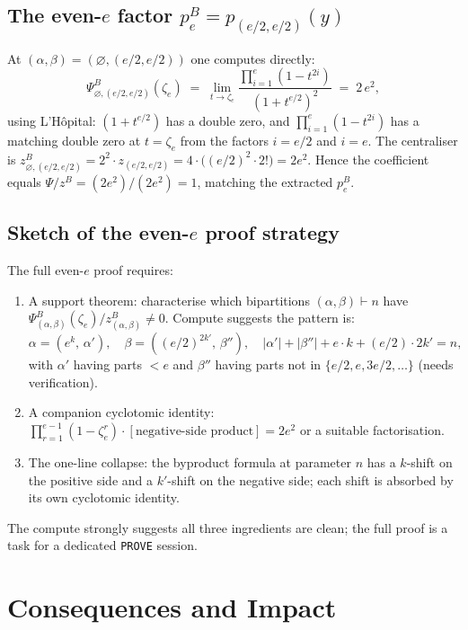 \documentclass[11pt]{article}
\theoremstyle{remark}
\newcommand{\peB}{p_e^B}
\newcommand{\zetae}{\zeta_e}
\newcommand{\emptyy}{\varnothing}
\begin{document}
\subsection*{The even-$e$ factor $\peB = p_{(e/2, e/2)}(y)$}

At $(\alpha, \beta) = (\emptyy, (e/2, e/2))$ one computes directly:
\[
  \Psi^B_{\emptyy, (e/2, e/2)}(\zetae)
  \;=\; \lim_{t \to \zetae} \frac{\prod_{i=1}^{e}(1-t^{2i})}{(1+t^{e/2})^2}
  \;=\; 2\, e^2,
\]
using L'H\^opital: $(1+t^{e/2})$ has a double zero, and $\prod_{i=1}^{e}(1-t^{2i})$ has a matching double zero at $t = \zetae$ from the factors $i = e/2$ and $i = e$. The centraliser is $z^B_{\emptyy, (e/2, e/2)} = 2^2 \cdot z_{(e/2, e/2)} = 4 \cdot \bigl( (e/2)^2 \cdot 2! \bigr) = 2 e^2$. Hence the coefficient equals $\Psi/z^B = (2 e^2)/(2 e^2) = 1$, matching the extracted $\peB$.

\subsection*{Sketch of the even-$e$ proof strategy}

The full even-$e$ proof requires:
\begin{enumerate}
  \item A support theorem: characterise which bipartitions $(\alpha, \beta) \vdash n$ have $\Psi^B_{(\alpha,\beta)}(\zetae)/z^B_{(\alpha,\beta)} \ne 0$. Compute suggests the pattern is:
  \[
    \alpha = (e^k,\, \alpha'), \quad \beta = ((e/2)^{2k'},\, \beta''), \quad |\alpha'| + |\beta''| + e\cdot k + (e/2) \cdot 2k' = n,
  \]
  with $\alpha'$ having parts $< e$ and $\beta''$ having parts not in $\{e/2, e, 3e/2, \ldots\}$ (needs verification).
  \item A companion cyclotomic identity: $\prod_{r=1}^{e-1}(1-\zetae^r) \cdot [\text{negative-side product}] = 2 e^2$ or a suitable factorisation.
  \item The one-line collapse: the byproduct formula at parameter $n$ has a $k$-shift on the positive side and a $k'$-shift on the negative side; each shift is absorbed by its own cyclotomic identity.
\end{enumerate}
The compute strongly suggests all three ingredients are clean; the full proof is a task for a dedicated \texttt{PROVE} session.

\section{Consequences and Impact}
\end{document}
